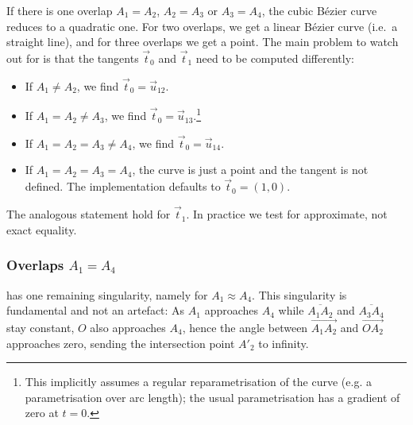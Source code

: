 \documentclass[12pt,a4paper]{article}
\theoremstyle{definition}
\newcommand{\tv}{\vec{t}}
\newcommand{\uv}{\vec{u}}
\begin{document}
If there is one overlap $A_1=A_2$, $A_2=A_3$ or $A_3=A_4$, the cubic Bézier curve reduces to a quadratic one. For two overlaps, we get a linear Bézier curve (i.e.\ a straight line), and for three overlaps we get a point. The main problem to watch out for is that the tangents $\tv_0$ and $\tv_1$ need to be computed differently:
\begin{itemize}
  \item If $A_1 \neq A_2$, we find $\tv_0 = \uv_{12}$.
  \item If $A_1 = A_2 \neq A_3$, we find $\tv_0 = \uv_{13}$.\footnote{This implicitly assumes a regular reparametrisation of the curve (e.g. a parametrisation over arc length); the usual parametrisation has a gradient of zero at $t=0$.}
  \item If $A_1 = A_2 = A_3 \neq A_4$, we find $\tv_0 = \uv_{14}$.
  \item If $A_1 = A_2 = A_3 = A_4$, the curve is just a point and the tangent is not defined. The implementation defaults to $\tv_0 = (1,0)$.
\end{itemize}
The analogous statement hold for $\tv_1$. In practice we test for approximate, not exact equality.

\subsubsection{Overlaps \texorpdfstring{$A_1 = A_4$}{A\_1 = A\_4}}

 has one remaining singularity, namely for $A_1 \approx A_4$. This singularity is fundamental and not an artefact: As $A_1$ approaches $A_4$ while $\overline{A_1A_2}$ and $\overline{A_3A_4}$ stay constant, $O$ also approaches $A_4$, hence the angle between $\overrightarrow{A_1A_2}$ and $\overrightarrow{OA_2}$ approaches zero, sending the intersection point $A'_2$ to infinity.
\end{document}
